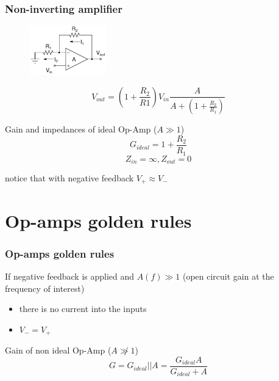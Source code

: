 \documentclass[beamer]{standalone}
\begin{document}
\begin{frame}
\frametitle{Non-inverting amplifier}
\begin{figure}
	\includegraphics[width=0.30\textwidth]{./schematics/noninv_ampl.pdf}
\end{figure}
\begin{equation*}
	V_{out}=\left( 1+\frac{R_2}{R1} \right) V_{in}
	\frac{A}{A+(1+\frac{R_2}{R_1})}
\end{equation*}

\begin{block}{Gain  and impedances of ideal Op-Amp ($A \gg 1$)}
\begin{equation*}
	G_{ideal}=1+\frac{R_2}{R_1} 
\end{equation*}
\begin{equation*}
	Z_{in}=\infty, Z_{out}=0
\end{equation*}
\end{block}
\alert{notice that with negative feedback $V_{+} \approx V_-$}
\end{frame}
	
\section{Op-amps golden rules}
\begin{frame}
\frametitle{Op-amps golden rules}
If \alert{negative feedback is applied} and \alert{$A(f) \gg 1$} (open
circuit gain  at the frequency of interest)
\begin{itemize}
	\item there is no current into the inputs
	\item $V_- = V_+$
\end{itemize}
\begin{block}{Gain of non ideal Op-Amp ($A \not\gg 1$)}
	\[ G=G_{ideal} || A 
	=	\frac{G_{ideal} A}{G_{ideal} + A}\]
\end{block}
\end{frame}
\end{document}
